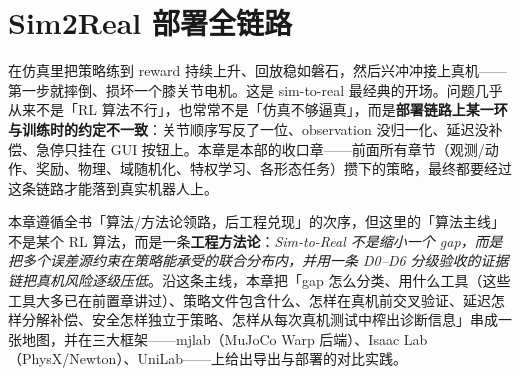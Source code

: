 \chapter{Sim2Real 部署全链路}\label{ch:rlmc-sim2real}


在仿真里把策略练到 reward 持续上升、回放稳如磐石，然后兴冲冲接上真机——第一步就摔倒、损坏一个膝关节电机。这是 sim-to-real 最经典的开场。问题几乎从来不是「RL 算法不行」，也常常不是「仿真不够逼真」，而是\textbf{部署链路上某一环与训练时的约定不一致}：关节顺序写反了一位、observation 没归一化、延迟没补偿、急停只挂在 GUI 按钮上。本章是本部的收口章——前面所有章节（观测/动作、奖励、物理、域随机化、特权学习、各形态任务）攒下的策略，最终都要经过这条链路才能落到真实机器人上。

本章遵循全书「算法/方法论领路，后工程兑现」的次序，但这里的「算法主线」不是某个 RL 算法，而是一条\textbf{工程方法论}：\emph{Sim-to-Real 不是缩小一个 gap，而是把多个误差源约束在策略能承受的联合分布内，并用一条 D0--D6 分级验收的证据链把真机风险逐级压低}。沿这条主线，本章把「gap 怎么分类、用什么工具（这些工具大多已在前置章讲过）、策略文件包含什么、怎样在真机前交叉验证、延迟怎样分解补偿、安全怎样独立于策略、怎样从每次真机测试中榨出诊断信息」串成一张地图，并在三大框架——mjlab（MuJoCo Warp 后端）、Isaac Lab（PhysX/Newton）、UniLab——上给出导出与部署的对比实践。

